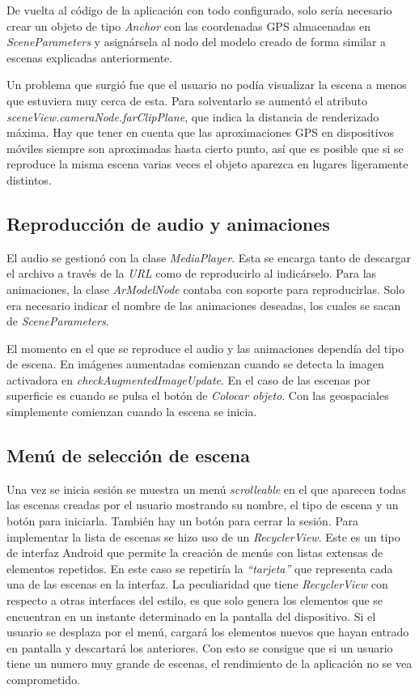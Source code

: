 De vuelta al código de la aplicación con todo configurado, solo sería necesario crear un objeto de tipo \textit{Anchor} con las coordenadas GPS almacenadas en \textit{SceneParameters} y asignársela al nodo del modelo creado de forma similar a escenas explicadas anteriormente.

Un problema que surgió fue que el usuario no podía visualizar la escena a menos que estuviera muy cerca de esta. Para solventarlo se aumentó el atributo \textit{sceneView.cameraNode.farClipPlane}, que indica la distancia de renderizado máxima. Hay que tener en cuenta que las aproximaciones GPS en dispositivos móviles siempre son aproximadas hasta cierto punto, así que es posible que si se reproduce la misma escena varias veces el objeto aparezca en lugares ligeramente distintos. 

\subsection{Reproducción de audio y animaciones}

El audio se gestionó con la clase \textit{MediaPlayer}. Esta se encarga tanto de descargar el archivo a través de la \textit{URL} como de reproducirlo al indicárselo. Para las animaciones, la clase \textit{ArModelNode} contaba con soporte para reproducirlas. Solo era necesario indicar el nombre de las animaciones deseadas, los cuales se sacan de \textit{SceneParameters}.

El momento en el que se reproduce el audio y las animaciones dependía del tipo de escena. En imágenes aumentadas comienzan cuando se detecta la imagen activadora en \textit{checkAugmentedImageUpdate}. En el caso de las escenas por superficie es cuando se pulsa el botón de \textit{Colocar objeto}. Con las geospaciales simplemente comienzan cuando la escena se inicia.

\subsection{Menú de selección de escena}

Una vez se inicia sesión se muestra un menú \textit{scrolleable} en el que aparecen todas las escenas creadas por el usuario mostrando su nombre, el tipo de escena y un botón para iniciarla. También hay un botón para cerrar la sesión. Para implementar la lista de escenas se hizo uso de un \textit{RecyclerView}. Este es un tipo de interfaz Android que permite la creación de menús con listas extensas de elementos repetidos. En este caso se repetiría la \textit{``tarjeta''} que representa cada una de las escenas en la interfaz. La peculiaridad que tiene \textit{RecyclerView} con respecto a otras interfaces del estilo, es que solo genera los elementos que se encuentran en un instante determinado en la pantalla del dispositivo. Si el usuario se desplaza por el menú, cargará los elementos nuevos que hayan entrado en pantalla y descartará los anteriores. Con esto se consigue que si un usuario tiene un numero muy grande de escenas, el rendimiento de la aplicación no se vea comprometido.

